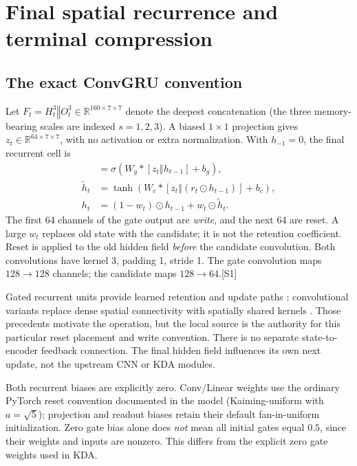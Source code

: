 \documentclass[10pt,letterpaper]{article}
\newcommand{\R}{\mathbb{R}}
\newcommand{\cat}{\mathbin\Vert}
\newcommand{\src}[1]{\textcolor{accent}{\textsf{[#1]}}}
\newcommand{\psection}[1]{\clearpage\section{#1}}
\begin{document}
\psection{Final spatial recurrence and terminal compression}
\subsection{The exact ConvGRU convention}
Let $F_t=H_t^3\cat O_t^3\in\R^{160\times7\times7}$ denote the deepest concatenation (the three memory-bearing scales are indexed $s=1,2,3$). A biased $1\times1$ projection gives $z_t\in\R^{64\times7\times7}$, with no activation or extra normalization. With $h_{-1}=0$, the final recurrent cell is
\begin{align}
[w_t,r_t]&=\sigma\!\left(W_g* [z_t\cat h_{t-1}]+b_g\right),\label{eq:gates}\\
\tilde h_t&=\tanh\!\left(W_c*[z_t\cat(r_t\odot h_{t-1})]+b_c\right),\\
h_t&=(1-w_t)\odot h_{t-1}+w_t\odot\tilde h_t.\label{eq:convgru}
\end{align}
The first 64 channels of the gate output are \emph{write}, and the next 64 are reset. A large $w_t$ replaces old state with the candidate; it is not the retention coefficient. Reset is applied to the old hidden field \emph{before} the candidate convolution. Both convolutions have kernel 3, padding 1, stride 1. The gate convolution maps $128\to128$ channels; the candidate maps $128\to64$.\src{S1}

Gated recurrent units provide learned retention and update paths \cite{gru}; convolutional variants replace dense spatial connectivity with spatially shared kernels \cite{convgru}. Those precedents motivate the operation, but the local source is the authority for this particular reset placement and write convention. There is no separate state-to-encoder feedback connection. The final hidden field influences its own next update, not the upstream CNN or KDA modules.

Both recurrent biases are explicitly zero. Conv/Linear weights use the ordinary PyTorch reset convention documented in the model (Kaiming-uniform with $a=\sqrt5$); projection and readout biases retain their default fan-in-uniform initialization. Zero gate bias alone does \emph{not} mean all initial gates equal $0.5$, since their weights and inputs are nonzero. This differs from the explicit zero gate weights used in KDA.
\end{document}
